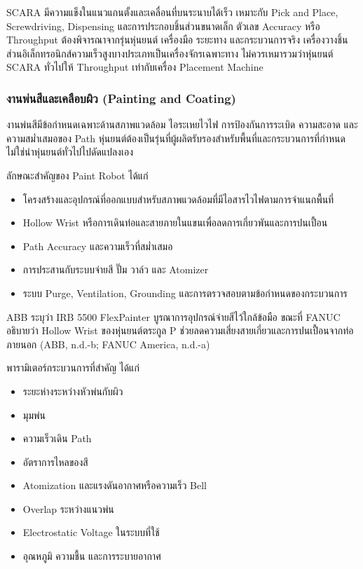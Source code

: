 SCARA มีความแข็งในแนวแกนตั้งและเคลื่อนที่บนระนาบได้เร็ว เหมาะกับ Pick and Place, Screwdriving, Dispensing และการประกอบชิ้นส่วนขนาดเล็ก ตัวเลข Accuracy หรือ Throughput ต้องพิจารณาจากรุ่นหุ่นยนต์ เครื่องมือ ระยะทาง และกระบวนการจริง เครื่องวางชิ้นส่วนอิเล็กทรอนิกส์ความเร็วสูงบางประเภทเป็นเครื่องจักรเฉพาะทาง ไม่ควรเหมารวมว่าหุ่นยนต์ SCARA ทั่วไปให้ Throughput เท่ากับเครื่อง Placement Machine

\subsubsection{งานพ่นสีและเคลือบผิว (Painting and Coating)}

งานพ่นสีมีข้อกำหนดเฉพาะด้านสภาพแวดล้อม ไอระเหยไวไฟ การป้องกันการระเบิด ความสะอาด และความสม่ำเสมอของ Path หุ่นยนต์ต้องเป็นรุ่นที่ผู้ผลิตรับรองสำหรับพื้นที่และกระบวนการที่กำหนด ไม่ใช่นำหุ่นยนต์ทั่วไปไปดัดแปลงเอง

ลักษณะสำคัญของ Paint Robot ได้แก่

\begin{itemize}
    \item โครงสร้างและอุปกรณ์ที่ออกแบบสำหรับสภาพแวดล้อมที่มีไอสารไวไฟตามการจำแนกพื้นที่
    \item Hollow Wrist หรือการเดินท่อและสายภายในแขนเพื่อลดการเกี่ยวพันและการปนเปื้อน
    \item Path Accuracy และความเร็วที่สม่ำเสมอ
    \item การประสานกับระบบจ่ายสี ปั๊ม วาล์ว และ Atomizer
    \item ระบบ Purge, Ventilation, Grounding และการตรวจสอบตามข้อกำหนดของกระบวนการ
\end{itemize}

ABB ระบุว่า IRB 5500 FlexPainter บูรณาการอุปกรณ์จ่ายสีไว้ใกล้ข้อมือ ขณะที่ FANUC อธิบายว่า Hollow Wrist ของหุ่นยนต์ตระกูล P ช่วยลดความเสี่ยงสายเกี่ยวและการปนเปื้อนจากท่อภายนอก (ABB, n.d.-b; FANUC America, n.d.-a)

พารามิเตอร์กระบวนการที่สำคัญ ได้แก่

\begin{itemize}
    \item ระยะห่างระหว่างหัวพ่นกับผิว
    \item มุมพ่น
    \item ความเร็วเดิน Path
    \item อัตราการไหลของสี
    \item Atomization และแรงดันอากาศหรือความเร็ว Bell
    \item Overlap ระหว่างแนวพ่น
    \item Electrostatic Voltage ในระบบที่ใช้
    \item อุณหภูมิ ความชื้น และการระบายอากาศ
\end{itemize}


